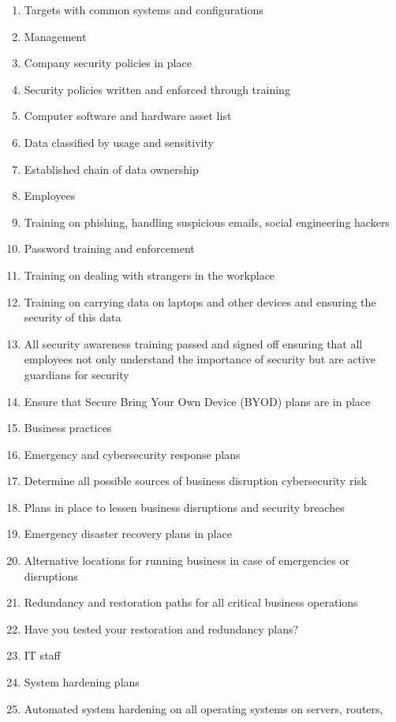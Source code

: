		
		\begin{enumerate}
			\item Targets with common systems and configurations
			\item Management
			\item Company security policies in place
			\item Security policies written and enforced through training
			\item Computer software and hardware asset list
			\item Data classified by usage and sensitivity
			\item Established chain of data ownership
			\item Employees
			\item Training on phishing, handling suspicious emails, social engineering hackers
			\item Password training and enforcement
			\item Training on dealing with strangers in the workplace
			\item Training on carrying data on laptops and other devices and ensuring the security
			of this data
			\item All security awareness training passed and signed off ensuring that all employees
			not only understand the importance of security but are active guardians for
			security
			\item Ensure that Secure Bring Your Own Device (BYOD) plans are in place
			\item Business practices
			\item Emergency and cybersecurity response plans
			\item Determine all possible sources of business disruption cybersecurity risk
			\item Plans in place to lessen business disruptions and security breaches
			\item Emergency disaster recovery plans in place
			\item Alternative locations for running business in case of emergencies or disruptions
			\item Redundancy and restoration paths for all critical business operations
			\item Have you tested your restoration and redundancy plans?
			\item IT staff
			\item System hardening plans
			\item Automated system hardening on all operating systems on servers, routers,

\end{enumerate}
